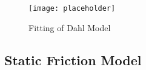 \begin{figure}[h]
    \centering
    \texttt{[image: placeholder]}
    \caption{Fitting of Dahl Model}
    \label{fig: Dahl model fit}
\end{figure}

\subsection{Static Friction Model}




